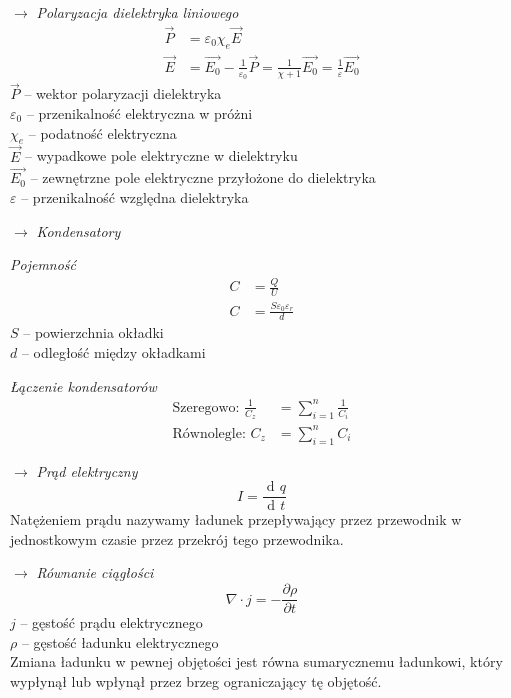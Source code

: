\documentclass[12pt]{article}
\newenvironment{wzor}[1]{\par{\Large $\longrightarrow$ \textit{#1}}}
    {\newline {\color{grey} \rule{\linewidth}{0.3pt}}}
\DeclareMathOperator{\der}{\operatorname{d}\!}
\begin{document}
\begin{wzor}{Polaryzacja dielektryka liniowego}
    \begin{align}
        \Vec{P} &= \varepsilon_0 \chi_e \Vec{E}\\
        \Vec{E} &= \Vec{E_0} - \frac{1}{\varepsilon_0} \Vec{P}
                 = \frac{1}{\chi + 1} \Vec{E_0}
                 = \frac{1}{\varepsilon} \Vec{E_0}
    \end{align}
    $\Vec{P}$ -- wektor polaryzacji dielektryka\\
    $\varepsilon_0$ -- przenikalność elektryczna w próżni\\
    $\chi_e$ -- podatność elektryczna\\
    $\Vec{E}$ -- wypadkowe pole elektryczne w dielektryku\\
    $\Vec{E_0}$ -- zewnętrzne pole elektryczne przyłożone do dielektryka\\
    $\varepsilon$ -- przenikalność względna dielektryka
\end{wzor}

\begin{wzor}{Kondensatory}
    \par\textit{Pojemność}
    \begin{align}
        C &= \frac{Q}{U}\\
        C &= \frac{S\varepsilon_0 \varepsilon_r}{d}
    \end{align}
    $S$ -- powierzchnia okładki\\
    $d$ -- odległość między okładkami
    \newpage
    \par \textit{Łączenie kondensatorów} 
    \begin{align}
        \text{Szeregowo: } \frac{1}{C_z} &= \sum\limits_{i=1}^n \frac{1}{C_i} \\
        \text{Równolegle: } C_z &= \sum\limits_{i=1}^n C_i
    \end{align}
\end{wzor}

\begin{wzor}{Prąd elektryczny}
    \begin{equation}
        I = \frac{\der q}{\der t}
    \end{equation}
    Natężeniem prądu nazywamy ładunek przepływający przez przewodnik w jednostkowym czasie
    przez przekrój tego przewodnika.
\end{wzor}

\begin{wzor}{Równanie ciągłości}
    \begin{equation}
        \nabla \cdot j = - \frac{\partial \rho}{\partial t}
    \end{equation}
    $j$ -- gęstość prądu elektrycznego\\
    $\rho$ -- gęstość ładunku elektrycznego\\
    Zmiana ładunku w pewnej objętości jest równa sumarycznemu ładunkowi,
    który wypłynął lub wpłynął przez brzeg ograniczający tę objętość.
\end{wzor}
\end{document}
